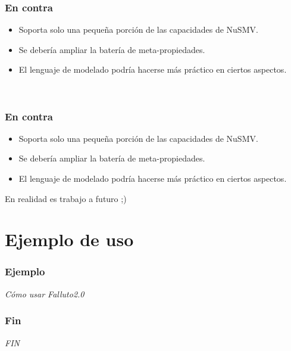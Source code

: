 \documentclass[serif]{beamer}
\begin{document}
\begin{frame}
\frametitle{En contra}
\begin{itemize}\itemsep15pt
\item Soporta solo una pequeña porción de las capacidades de NuSMV.
\item Se debería ampliar la batería de meta-propiedades.
\item El lenguaje de modelado podría hacerse más práctico en ciertos aspectos.
\end{itemize}
\vspace{15pt}
\begin{center}{\LARGE ~}\end{center}
\end{frame}


\begin{frame}
\frametitle{En contra}
\begin{itemize}\itemsep15pt
\item Soporta solo una pequeña porción de las capacidades de NuSMV.
\item Se debería ampliar la batería de meta-propiedades.
\item El lenguaje de modelado podría hacerse más práctico en ciertos aspectos.
\end{itemize}
\vspace{15pt}
\begin{center}{\color{red} \LARGE En realidad es trabajo a futuro ;)}\end{center}
\end{frame}



\section[Ejemplo]{Ejemplo de uso}
\begin{frame}
\frametitle{Ejemplo}
\begin{center}{\LARGE \emph{Cómo usar Falluto2.0}}\end{center}
\end{frame}




\begin{frame}
\frametitle{Fin}
\begin{center}{\LARGE \emph{FIN}}\end{center}
\end{frame}


\end{document}
